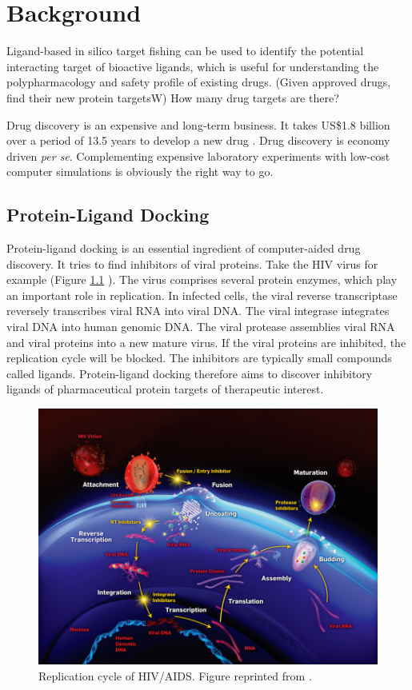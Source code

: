 \chapter{Background}

\citep{1402} Ligand-based in silico target fishing can be used to identify the potential interacting target of bioactive ligands, which is useful for understanding the polypharmacology and safety profile of existing drugs. (Given approved drugs, find their new protein targetsW)
\citep{1417} How many drug targets are there?

Drug discovery is an expensive and long-term business. It takes US\$1.8 billion over a period of 13.5 years to develop a new drug \citep{716}. Drug discovery is economy driven \textit{per se}. Complementing expensive laboratory experiments with low-cost computer simulations is obviously the right way to go.

\section{Protein-Ligand Docking}

Protein-ligand docking is an essential ingredient of computer-aided drug discovery. It tries to find inhibitors of viral proteins. Take the HIV virus for example (Figure \ref{fig:HIV} \citep{296}). The virus comprises several protein enzymes, which play an important role in replication. In infected cells, the viral reverse transcriptase reversely transcribes viral RNA into viral DNA. The viral integrase integrates viral DNA into human genomic DNA. The viral protease assemblies viral RNA and viral proteins into a new mature virus. If the viral proteins are inhibited, the replication cycle will be blocked. The inhibitors are typically small compounds called ligands. Protein-ligand docking therefore aims to discover inhibitory ligands of pharmaceutical protein targets of therapeutic interest.

\begin{figure}[h]
\centering
\includegraphics[width=\textwidth]{../idock/HIVReplicationCycle.png}
\caption{Replication cycle of HIV/AIDS. Figure reprinted from \citep{296}.}
\label{fig:HIV}
\end{figure}


